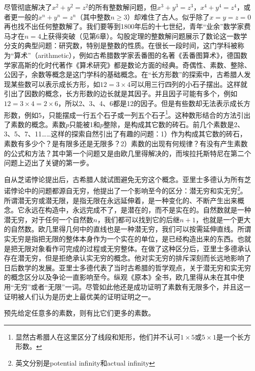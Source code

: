 \documentclass[b5paper]{ctexart}
\begin{document}
尽管彻底解决了$x^2 + y^2 = z^2$的所有整数解问题，但$x^3 + y^3 = z^3$，$x^4 + y^4 = z^4$，或者更一般的$x^n + y^n = z^n$（其中整数$n \geq 3$）却难住了古人。似乎除了$x = y = z = 0$再也找不出任何整数解了。我们要等到1800年后的十七世纪，青年“业余”数学家费马才在$n = 4$上获得突破（见第6章）。勾股定理的整数解问题展示了数论这一数学分支的典型问题：研究数，特别是整数的性质。在很长一段时间，这门学科被称为“算术”（arithmetic），例如古希腊数学家丢番图的名著《丢番图算术》，德国数学家高斯的化时代著作《算术研究》都是数论方面的经典。奇偶性、素数、整除、公因子，余数等概念是这门学科的基础概念。在“长方形数”的探索中，古希腊人发现某些数可以表示成长方形，如$12 = 3 \times 4$可以用三行四列的小石子摆出。这样就引出了因数的概念，长方形数的边长就是其因子。并且因子可能有多个，例如$12 = 3 \times 4 = 2 \times 6$，所以2、3、4、6都是12的因子。但是有些数却无法表示成长方形数，例如5，只能摆成一行五个石子或一列五个石子\footnote{显然古希腊人在这里区分了线段和矩形，他们并不认可$1 \times 5$或$5 \times 1$是一个长方形数。}。这种数形结合的方法引出了素数的概念。素数$p$只能被1和$p$整除，是构成其它数的砖石。前几个素数是2、3、5、7、11……这样的探索自然引出了有趣的问题：1）作为构成其它数的砖石，素数有多少个？是有限多还是无限多？2）素数的出现有何规律？有没有产生素数的公式和方法？其中第一个问题又是由欧几里得解决的，而埃拉托斯特尼在第二个问题上迈出了关键的第一步。

自从芝诺悖论提出后，古希腊人就试图避免无穷这个概念。亚里士多德认为所有芝诺悖论中的问题都源自无穷，他提出了一个影响至今的区分：潜无穷和实无穷\footnote{英文分别是potential infinity和actual infinity}。所谓潜无穷或潜无限，是指无限在永远延伸着，是一种变化的、不断产生出来概念。它永远在构造中，永远完成不了，是潜在的，而不是实在的。自然数就是一种潜无穷，对于任何一个自然数$n$，我们都可以找到它的后继$n + 1$，也就是一个更大的自然数。欧几里得几何中的直线也是一种潜无穷，我们可以按需延伸直线。所谓实无穷是指把无限的整体本身作为一个实在的单位，是已经构造出来的东西。也就是把无限对象看作可完成的过程或无穷整体。在做了这种区分后，亚里士多德承认存在潜无穷，但是拒绝承认实无穷的概念。他对实无穷的排斥深刻而长远地影响了日后数学的发展\cite{HanXueTao16}。亚里士多德代表了当时古希腊的哲学观点，关于潜无穷和实无穷的概念区分以及争论一直影响至今。纵观《原本》全书，欧几里得从未在其中使用“无穷”或者“无限”一词。尽管如此他还是成功证明了素数有无限多个，并且这一证明被人们认为是历史上最优美的证明证明之一。

\begin{theorem}
预先给定任意多的素数，则有比它们更多的素数。
\end{theorem}
\end{document}
